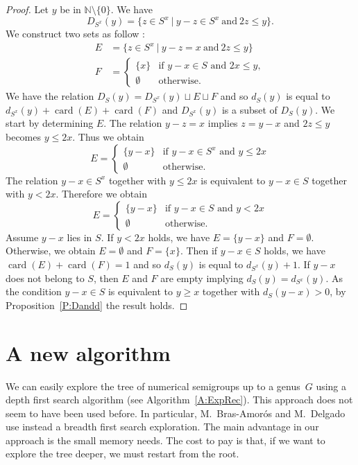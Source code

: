 \documentclass[reqno]{amsart}
\theoremstyle{plain}
\theoremstyle{definition}
\renewcommand{\leq}{\leqslant}
\renewcommand{\geq}{\geqslant}
\newcommand{\NN}{\mathbb{N}}
\DeclareMathOperator{\card}{card}
\begin{document}
\begin{proof}
Let $y$ be in $\NN\setminus\{0\}$. We have 
\[
D_{S^x}(y)=\{z \in S^x\ |\ y-z\in S^x\ \text{and}\  2z\leq y\}.
\]
We construct two sets as follow :
\begin{align*}
E&=\{z\in S^x\ |\ y-z=x\ \text{and}\ 2z\leq y\}\\
F&=\begin{cases}
\{x\}&\text{if $y-x\in S$ and $2x\leq y$},\\
\emptyset&\text{otherwise}.
\end{cases}
\end{align*}
We have the relation $D_{S}(y)=D_{S^x}(y)\sqcup E\sqcup F$ and so $d_S(y)$ is equal to $d_{S^x}(y)+\card(E)+\card(F)$
and $D_{S^x}(y)$ is a subset of $D_S(y)$. We start by determining $E$. 
The relation $y-z=x$ implies $z=y-x$ and $2z\leq y$ becomes $y\leq 2x$. Thus we obtain
\[
E=\begin{cases}
\{y-x\}&\text{if $y-x\in S^x$ and $y\leq 2x$}\\
\emptyset&\text{otherwise}.
\end{cases}
\] 
The relation $y-x\in S^x$ together with $y\leq2x$ is equivalent to $y-x\in S$ together with $y<2x$.
Therefore we obtain
\[
E=\begin{cases}
\{y-x\}&\text{if $y-x\in S$ and $y< 2x$}\\
\emptyset&\text{otherwise}.
\end{cases}
\] 
Assume $y-x$ lies in $S$.  If $y<2x$ holds, we have $E=\{y-x\}$ and $F=\emptyset$. Otherwise, we obtain $E=\emptyset$ and $F=\{x\}$. 
Then if $y-x\in S$ holds, we have $\card(E)+\card(F)=1$ and so $d_{S}(y)$ is equal to $d_{S^x}(y)+1$.
If $y-x$ does not belong to $S$, then $E$ and $F$ are empty implying $d_{S}(y)=d_{S^x}(y)$. As the condition $y-x\in S$ is equivalent to $y\geq x$ together with $d_S(y-x)>0$, by Proposition~\ref{P:Dandd} the result holds.
\end{proof}

\section{A new algorithm}
\label{S:Algo}
We can easily explore the tree of numerical semigroups up to a genus~$G$ using
a depth first search algorithm (see Algorithm~\ref{A:ExpRec}). This approach does not seem to
have been used before.  In particular, M.~Bras-Amor\'os and M.~Delgado use
instead a breadth first search exploration.  The main advantage in our
approach is the small memory needs.  The cost to pay is that, if we want to
explore the tree deeper, we must restart from the root.
\end{document}
